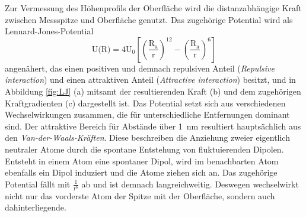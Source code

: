         Zur Vermessung des Höhenprofils der Oberfläche wird die distanzabhängige Kraft zwischen Messspitze und Oberfläche genutzt. Das zugehörige Potential wird als Lennard-Jones-Potential 
        \begin{equation*}
          \text{U(R)} = 4\text{U}_0 \left[ \left(\frac{\text{R}_{\text{a}}}{\text{r}}\right)^{12} - \left(\frac{\text{R}_{\text{a}}}{\text{r}}\right)^{6} \right]
        \end{equation*}
        angenähert, das einen positiven und demnach repulsiven Anteil (\textit{Repulsive interaction}) und einen attraktiven Anteil (\textit{Attractive interaction}) besitzt, und in Abbildung 
        \ref{fig:LJ} (a) mitsamt der resultierenden Kraft (b) und dem zugehörigen Kraftgradienten (c) dargestellt ist.
        Das Potential setzt sich aus verschiedenen Wechselwirkungen zusammen, die für unterschiedliche Entfernungen dominant sind.\newline 
        Der attraktive Bereich für Abstände über \SI{1}{\nano\metre} resultiert hauptsächlich aus den \textit{Van-der-Waals-Kräften}. Diese beschreiben die Anziehung zweier eigentlich neutraler Atome durch die 
        spontane Entstehung von fluktuierenden Dipolen. Entsteht in einem Atom eine 
        spontaner Dipol, wird im benachbarten Atom ebenfalls ein Dipol induziert und die Atome ziehen sich an. Das zugehörige Potential fällt mit $\frac{1}{\text{r}^6}$ ab und ist demnach langreichweitig. 
        Deswegen wechselwirkt nicht nur das vorderste Atom der Spitze mit der Oberfläche, sondern auch dahinterliegende.\newline
        \FloatBarrier
% 
